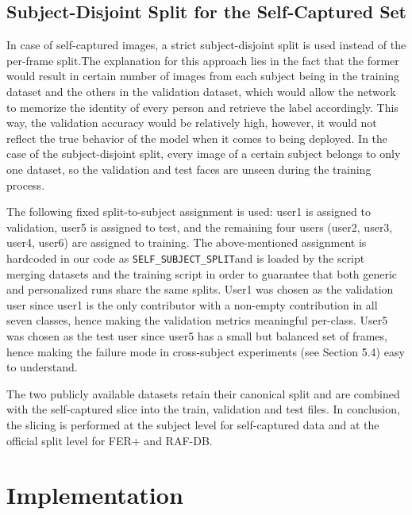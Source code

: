 \documentclass[12pt,a4paper]{article}
\begin{document}
\subsection{Subject-Disjoint Split for the Self-Captured Set}
\label{sec:data:split}

In case of self-captured images, a strict subject-disjoint split is used instead of the per-frame split.The explanation for this approach lies in the fact that the former would result in certain number of images from each subject being in the training dataset and the others in the validation dataset, which would allow the network to memorize the identity of every person and retrieve the label accordingly. This way, the validation accuracy would be relatively high, however, it would not reflect the true behavior of the model when it comes to being deployed. In the case of the subject-disjoint split, every image of a certain subject belongs to only one dataset, so the validation and test faces are unseen during the training process.

The following fixed split-to-subject assignment is used: user1 is assigned to validation, user5
is assigned to test, and the remaining four users (user2, user3, user4, user6) are assigned
to training. The above-mentioned assignment is hardcoded in our code as
\texttt{SELF\_\allowbreak SUBJECT\_\allowbreak SPLIT}and is loaded by the script merging datasets and the
training script in order to guarantee that both generic and personalized runs
share the same splits. User1 was chosen as the validation user since user1 is the only contributor with a non-empty contribution in all seven classes, hence making the validation metrics meaningful per-class. User5 was chosen as the test user since user5 has a small but balanced set of frames, hence making the failure mode in cross-subject experiments (see Section 5.4) easy to understand.

The two publicly available datasets retain their canonical split and are combined with the self-captured slice into the train, validation and test files. In conclusion, the slicing is performed at the subject level for self-captured data and at the official split level for FER+ and RAF-DB.

\section{Implementation}
\label{sec:impl}
\end{document}
